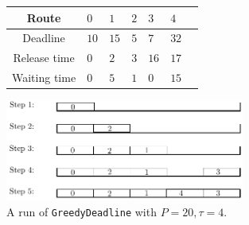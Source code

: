 \documentclass[a4paper,10pt]{journal}
\newcommand\greedydeadline{\texttt{GreedyDeadline}\xspace}
\begin{document}
    \begin{figure}
          \begin{center}
   \begin{tabularx}{0.7\textwidth}{|c|X|X|X|X|X|X|}
    \hline
     Route& $0$ & $1$ & $2$& $3$ & $4$\\
    \hline
    Deadline & $10$ &$15$&$5$&$7$&$32$\\
    \hline
     Release time & $0$ &$2$&$3$&$16$&$17$\\
    \hline
    Waiting time & $0$ &$5$&$1$&$0$&$15$\\
    \hline
      \end{tabularx}
      
      
      \includegraphics[width=0.7\textwidth]{examplegreedy.pdf}
      \caption{A run of \greedydeadline with $P = 20, \tau = 4$.}
           \label{fig:greedydeadline}
      \end{center}
      
    \end{figure}

     
   
       
\end{document}
